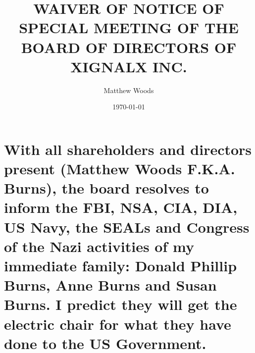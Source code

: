 \documentclass{article}
\title{WAIVER OF NOTICE OF SPECIAL MEETING OF THE BOARD OF DIRECTORS OF XIGNALX INC.}
\author{Matthew Woods}
\date{\today}
\begin{document}
\maketitle

\section{With all shareholders and directors present (Matthew Woods F.K.A. Burns), the board resolves to inform the FBI, NSA, CIA, DIA, US Navy, the SEALs and Congress of the Nazi activities of my immediate family: Donald Phillip Burns, Anne Burns and Susan Burns. I predict they will get the electric chair for what they have done to the US Government.} 
\end{document}
